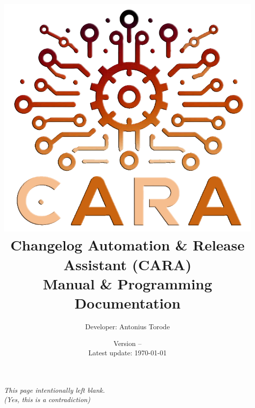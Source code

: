 \documentclass[openany,a4paper,10pt]{book}
\title{\vspace{0.1cm}  \includegraphics[scale=0.4]{./images/cara.png} \vspace{.5cm} \\ Changelog Automation \& Release Assistant (CARA) \\  Manual \& Programming Documentation}
\author{Developer: Antonius Torode}
\date{Version -- \version \\ Latest update: \today}
\begin{document}
\frontmatter
\maketitle

\tableofcontents
\newpage
\vspace*{\fill}
\begin{center}
	\textit{This page intentionally left blank. \\(Yes, this is a contradiction)}
\end{center}
\vspace*{\fill}

\mainmatter
\pagestyle{fancy}
\fancyhf{}
\fancyhead[RO, LE]{\thepage}







\backmatter
%

\printindex
\end{document}
